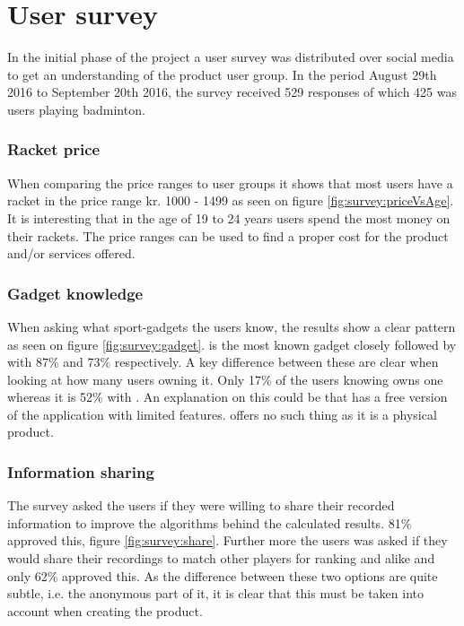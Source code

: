 \chapter{User survey}
\label{ch:userSurvey}
In the initial phase of the project a user survey was distributed over social media to get an understanding of the product user group.
In the period August 29th 2016 to September 20th 2016, the survey received 529 responses of which 425 was users playing badminton.

\subsection*{Racket price}
When comparing the price ranges to user groups it shows that most users have a racket in the price range kr. 1000 - 1499 as seen on figure \ref{fig:survey:priceVsAge}.
It is interesting that in the age of 19 to 24 years users spend the most money on their rackets.
The price ranges can be used to find a proper cost for the product and/or services offered.


\subsection*{Gadget knowledge}
When asking what sport-gadgets the users know, the results show a clear pattern as seen on figure \ref{fig:survey:gadget}.
 is the most known gadget closely followed by  with 87\% and 73\% respectively.
A key difference between these are clear when looking at how many users owning it.
Only 17\% of the users knowing  owns one whereas it is 52\% with .
An explanation on this could be that  has a free version of the application with limited features.
 offers no such thing as it is a physical product.


\subsection*{Information sharing}
The survey asked the users if they were willing to share their recorded information to improve the algorithms behind the calculated results. 
81\% approved this, figure \ref{fig:survey:share}.
Further more the users was asked if they would share their recordings to match other players for ranking and alike and only 62\% approved this.
As the difference between these two options are quite subtle, i.e. the anonymous part of it, it is clear that this must be taken into account when creating the product.
 
